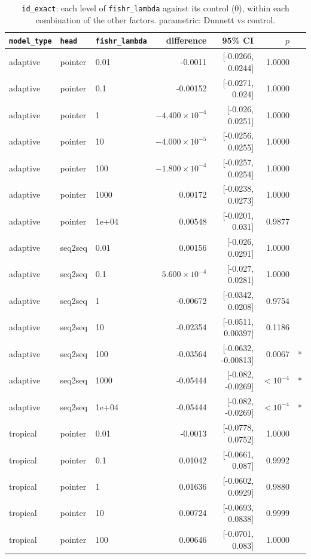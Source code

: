 \documentclass[10pt]{article}
\begin{document}
{\small
\begin{longtable}{lllrrrl}
\caption{\texttt{id\_exact}: each level of \texttt{fishr\_lambda} against its control (0), within each combination of the other factors. parametric: Dunnett vs control.}\label{tab:control-id_exact}\\
\toprule
\texttt{model\_type} & \texttt{head} & \texttt{fishr\_lambda} & difference & 95\% CI & $p$ & \\
\midrule
\endhead
adaptive & pointer & 0.01 & -0.0011 & [-0.0266, 0.0244] & 1.0000 & \\
adaptive & pointer & 0.1 & -0.00152 & [-0.0271, 0.024] & 1.0000 & \\
adaptive & pointer & 1 & $-4.400\times10^{-4}$ & [-0.026, 0.0251] & 1.0000 & \\
adaptive & pointer & 10 & $-4.000\times10^{-5}$ & [-0.0256, 0.0255] & 1.0000 & \\
adaptive & pointer & 100 & $-1.800\times10^{-4}$ & [-0.0257, 0.0254] & 1.0000 & \\
adaptive & pointer & 1000 & 0.00172 & [-0.0238, 0.0273] & 1.0000 & \\
adaptive & pointer & 1e+04 & 0.00548 & [-0.0201, 0.031] & 0.9877 & \\
adaptive & seq2seq & 0.01 & 0.00156 & [-0.026, 0.0291] & 1.0000 & \\
adaptive & seq2seq & 0.1 & $5.600\times10^{-4}$ & [-0.027, 0.0281] & 1.0000 & \\
adaptive & seq2seq & 1 & -0.00672 & [-0.0342, 0.0208] & 0.9754 & \\
adaptive & seq2seq & 10 & -0.02354 & [-0.0511, 0.00397] & 0.1186 & \\
adaptive & seq2seq & 100 & -0.03564 & [-0.0632, -0.00813] & 0.0067 & *\\
adaptive & seq2seq & 1000 & -0.05444 & [-0.082, -0.0269] & $<10^{-4}$ & *\\
adaptive & seq2seq & 1e+04 & -0.05444 & [-0.082, -0.0269] & $<10^{-4}$ & *\\
tropical & pointer & 0.01 & -0.0013 & [-0.0778, 0.0752] & 1.0000 & \\
tropical & pointer & 0.1 & 0.01042 & [-0.0661, 0.087] & 0.9992 & \\
tropical & pointer & 1 & 0.01636 & [-0.0602, 0.0929] & 0.9880 & \\
tropical & pointer & 10 & 0.00724 & [-0.0693, 0.0838] & 0.9999 & \\
tropical & pointer & 100 & 0.00646 & [-0.0701, 0.083] & 1.0000 & \\

\end{longtable}}
\end{document}
